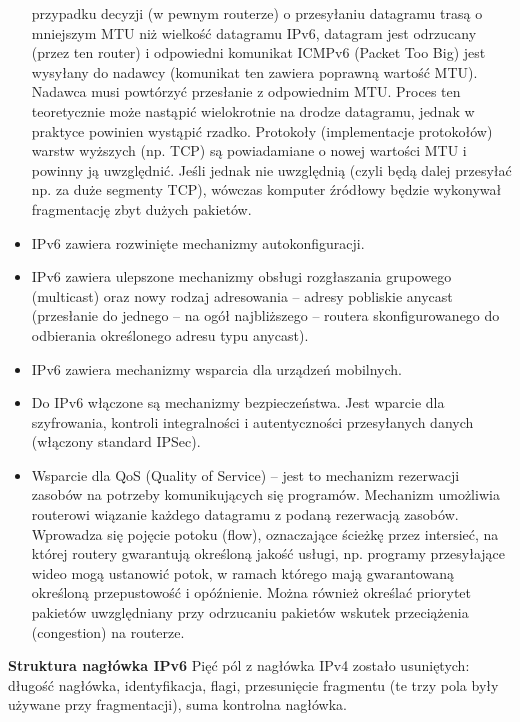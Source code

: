 \begin{itemize}
        przypadku decyzji (w pewnym routerze) o przesyłaniu datagramu trasą o mniejszym MTU
        niż wielkość datagramu IPv6, datagram jest odrzucany (przez ten router) i odpowiedni
        komunikat ICMPv6 (Packet Too Big) jest wysyłany do nadawcy (komunikat ten zawiera
        poprawną wartość MTU). Nadawca musi powtórzyć przesłanie z odpowiednim MTU.
        Proces ten teoretycznie może nastąpić wielokrotnie na drodze datagramu, jednak w
        praktyce powinien wystąpić rzadko. Protokoły (implementacje protokołów) warstw
        wyższych (np. TCP) są powiadamiane o nowej wartości MTU i powinny ją uwzględnić.
        Jeśli jednak nie uwzględnią (czyli będą dalej przesyłać np. za duże segmenty TCP),
        wówczas komputer źródłowy będzie wykonywał fragmentację zbyt dużych pakietów.
        \item IPv6 zawiera rozwinięte mechanizmy autokonfiguracji.
        \item IPv6 zawiera ulepszone mechanizmy obsługi rozgłaszania grupowego (multicast) oraz
        nowy rodzaj adresowania – adresy pobliskie anycast (przesłanie do jednego – na ogół
        najbliższego – routera skonfigurowanego do odbierania określonego adresu typu
        anycast).
        \item IPv6 zawiera mechanizmy wsparcia dla urządzeń mobilnych.
        \item Do IPv6 włączone są mechanizmy bezpieczeństwa. Jest wparcie dla szyfrowania, kontroli
        integralności i autentyczności przesyłanych danych (włączony standard IPSec).
        \item Wsparcie dla QoS (Quality of Service) – jest to mechanizm rezerwacji zasobów na
        potrzeby komunikujących się programów. Mechanizm umożliwia routerowi wiązanie
        każdego datagramu z podaną rezerwacją zasobów. Wprowadza się pojęcie potoku (flow),
        oznaczające ścieżkę przez intersieć, na której routery gwarantują określoną jakość usługi,
        np. programy przesyłające wideo mogą ustanowić potok, w ramach którego mają
        gwarantowaną określoną przepustowość i opóźnienie. Można również określać priorytet
        pakietów uwzględniany przy odrzucaniu pakietów wskutek przeciążenia (congestion) na
        routerze.
    \end{itemize}

    \textbf{Struktura nagłówka IPv6}
    Pięć pól z nagłówka IPv4 zostało usuniętych:
    długość nagłówka,
    identyfikacja, flagi, przesunięcie fragmentu (te trzy pola były używane przy fragmentacji),
    suma kontrolna nagłówka.

